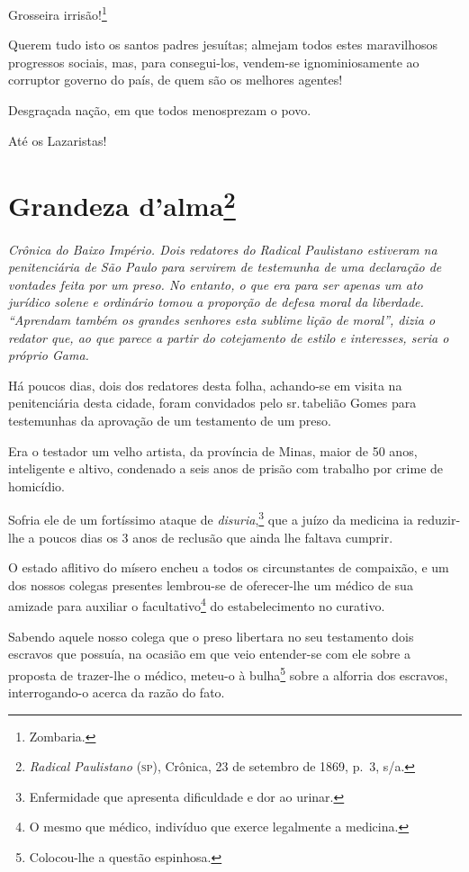 Grosseira irrisão!\footnote{Zombaria.}

Querem tudo isto os santos padres jesuítas; almejam todos estes
maravilhosos progressos sociais, mas, para consegui-los, vendem-se
ignominiosamente ao corruptor governo do país, de quem são os melhores
agentes!

Desgraçada nação, em que todos menosprezam o povo.

Até os Lazaristas!

\chapter{Grandeza d'alma\footnote{\emph{Radical Paulistano} (\textsc{sp}),
  Crônica, 23 de setembro de 1869, p.~3, s/a.}}

\begin{didascalia}\itshape
Crônica do Baixo Império. Dois redatores do \textnormal{Radical Paulistano}
estiveram na penitenciária de São Paulo para servirem de
testemunha de uma declaração de vontades feita por um preso. No entanto,
o que era para ser apenas um ato jurídico solene e ordinário tomou a
proporção de defesa moral da liberdade. ``Aprendam também os grandes
senhores esta sublime lição de moral'', dizia o redator que, ao que
parece a partir do cotejamento de estilo e interesses, seria o próprio
Gama.
\end{didascalia}



Há poucos dias, dois dos redatores desta folha, achando-se em visita na
penitenciária desta cidade, foram convidados pelo sr.\,tabelião Gomes
para testemunhas da aprovação de um testamento de um preso.

Era o testador um velho artista, da província de Minas, maior de 50
anos, inteligente e altivo, condenado a seis anos de prisão com trabalho
por crime de homicídio.

Sofria ele de um fortíssimo ataque de \emph{disuria},\footnote{
  Enfermidade que apresenta dificuldade e dor ao urinar.} que a juízo
da medicina ia reduzir-lhe a poucos dias os 3 anos de reclusão que ainda
lhe faltava cumprir.

O estado aflitivo do mísero encheu a todos os circunstantes de
compaixão, e um dos nossos colegas presentes lembrou-se de oferecer-lhe
um médico de sua amizade para auxiliar o facultativo\footnote{O mesmo
  que médico, indivíduo que exerce legalmente a medicina.} do
estabelecimento no curativo.

Sabendo aquele nosso colega que o preso libertara no seu testamento dois
escravos que possuía, na ocasião em que veio entender-se com ele sobre a
proposta de trazer-lhe o médico, meteu-o à bulha\footnote{Colocou-lhe
  a questão espinhosa.} sobre a alforria dos escravos, interrogando-o
acerca da razão do fato.

